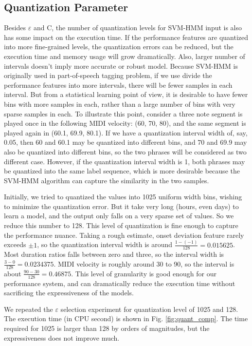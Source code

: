 \subsection{Quantization Parameter}
Besides $\varepsilon$ and C, the number of quantization levels for SVM-HMM input is also has some impact on the execution time. If the performance features are quantized into more fine-grained levels, the quantization errors can be reduced, but the execution time and memory usage will grow dramatically. Also, larger number of intervals doesn't imply more accurate or robust model. Because SVM-HMM is originally used in part-of-speech tagging problem, if we use divide the performance features into more intervals, there will be fewer samples in each interval. But from a statistical learning point of view, it is desirable to have fewer bins with more samples in each, rather than a large number of bins with very sparse samples in each. To illustrate this point, consider a three note segment is played once in the following MIDI velocity: (60, 70, 80), and the same segment is played again in (60.1, 69.9, 80.1). If we have a quantization interval width of, say, 0.05, then 60 and 60.1 may be quantized into different bins, and 70 and 69.9 may also be quantized into different bins, so the two phrases will be considered as two different case. However, if the quantization interval width is 1, both phrases may be quantized into the same label sequence, which is more desirable because the SVM-HMM algorithm can capture the similarity in the two samples. 

Initially, we tried to quantized the values into 1025 uniform width bins, wishing to minimize the quantization error. But it take very long (hours, even days) to learn a model, and the output only falls on a very sparse set of values. So we reduce this number to 128. This level of quantization is fine enough to capture the performance nuance. Taking a rough estimate, onset deviation feature rarely exceeds $\pm 1$, so the quantization interval width is around $\frac{1-(-1)}{128} = 0.015625$. Most duration ratios falls between zero and three, so the interval width is $\frac{3-0}{128} = 0.0234375$. MIDI velocity is roughly around 30 to 90, so the interval is about $\frac{90-30}{128} = 0.46875$. This level of granularity is good enough for our performance system, and can dramatically reduce the execution time without sacrificing the expressiveness of the models. 

We repeated the $\varepsilon$ selection experiment for quantization level of 1025 and 128. The execution time (in CPU second) is shown in Fig. \ref{fig:quant_comp}. The time required for 1025 is larger than 128 by orders of magnitudes, but the expressiveness does not improve much.%

